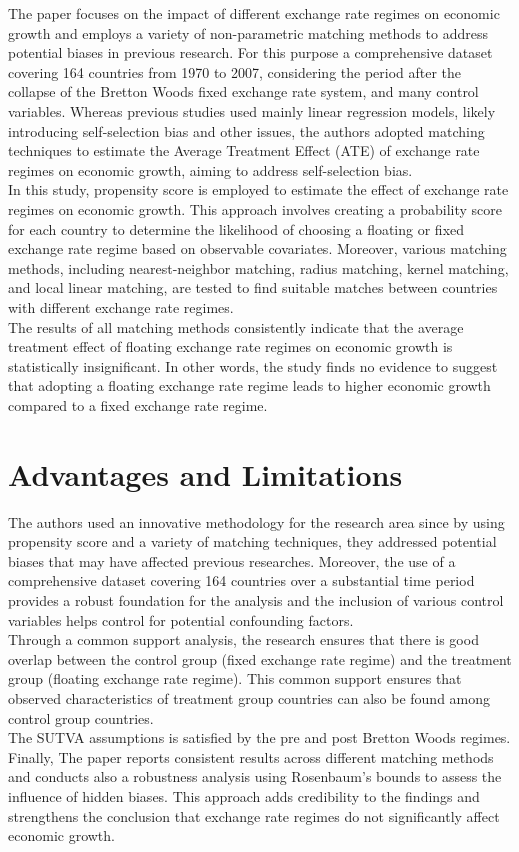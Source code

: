 \documentclass[
  12pt]{article}
\begin{document}
The paper focuses on the impact of different exchange rate regimes on
economic growth and employs a variety of non-parametric matching methods
to address potential biases in previous research. For this purpose a
comprehensive dataset covering 164 countries from 1970 to 2007,
considering the period after the collapse of the Bretton Woods fixed
exchange rate system, and many control variables. Whereas previous
studies used mainly linear regression models, likely introducing
self-selection bias and other issues, the authors adopted matching
techniques to estimate the Average Treatment Effect (ATE) of exchange
rate regimes on economic growth, aiming to address self-selection
bias.\\
In this study, propensity score is employed to estimate the effect of
exchange rate regimes on economic growth. This approach involves
creating a probability score for each country to determine the
likelihood of choosing a floating or fixed exchange rate regime based on
observable covariates. Moreover, various matching methods, including
nearest-neighbor matching, radius matching, kernel matching, and local
linear matching, are tested to find suitable matches between countries
with different exchange rate regimes.\\
The results of all matching methods consistently indicate that the
average treatment effect of floating exchange rate regimes on economic
growth is statistically insignificant. In other words, the study finds
no evidence to suggest that adopting a floating exchange rate regime
leads to higher economic growth compared to a fixed exchange rate
regime.

\hypertarget{advantages-and-limitations}{%
\section{Advantages and Limitations}\label{advantages-and-limitations}}

The authors used an innovative methodology for the research area since
by using propensity score and a variety of matching techniques, they
addressed potential biases that may have affected previous researches.
Moreover, the use of a comprehensive dataset covering 164 countries over
a substantial time period provides a robust foundation for the analysis
and the inclusion of various control variables helps control for
potential confounding factors.\\
Through a common support analysis, the research ensures that there is
good overlap between the control group (fixed exchange rate regime) and
the treatment group (floating exchange rate regime). This common support
ensures that observed characteristics of treatment group countries can
also be found among control group countries.\\
The SUTVA assumptions is satisfied by the pre and post Bretton Woods
regimes.\\
Finally, The paper reports consistent results across different matching
methods and conducts also a robustness analysis using Rosenbaum's bounds
to assess the influence of hidden biases. This approach adds credibility
to the findings and strengthens the conclusion that exchange rate
regimes do not significantly affect economic growth.
\end{document}

